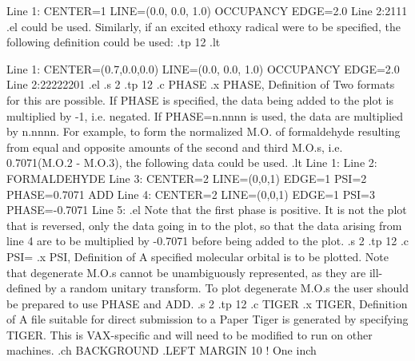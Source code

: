 Line 1:  CENTER=1 LINE=(0.0, 0.0, 1.0) OCCUPANCY EDGE=2.0 
Line 2:2111
.el
could be used. Similarly, if an excited ethoxy radical were to be specified,
the following definition could be used:
.tp 12
.lt

Line 1:  CENTER=(0.7,0.0,0.0) LINE=(0.0, 0.0, 1.0) OCCUPANCY EDGE=2.0 
Line 2:22222201
.el
.s 2
.tp 12
.c
 PHASE
.x PHASE, Definition of
 Two formats for this are possible. If PHASE is specified, the
data being added to the plot is multiplied by -1, i.e. negated. 
If PHASE=n.nnnn is used,
the data are multiplied by n.nnnn. For example, to form the normalized
M.O. of formaldehyde resulting from equal and opposite amounts of the
second and third M.O.s, i.e. 0.7071(M.O.2 - M.O.3), the following 
data could be used.
.lt
Line 1:
Line 2:   FORMALDEHYDE
Line 3: CENTER=2 LINE=(0,0,1) EDGE=1 PSI=2 PHASE=0.7071 ADD
Line 4: CENTER=2 LINE=(0,0,1) EDGE=1 PSI=3 PHASE=-0.7071
Line 5:
.el
 Note that the first phase is positive. It is not the plot that is reversed,
only the data going in to the plot, so that the data arising from line 4
are to be multiplied by -0.7071 before being added to the plot.
.s 2
.tp 12
.c
 PSI=        
.x PSI, Definition of
 A specified molecular orbital is to be plotted. Note that degenerate
M.O.s cannot be unambiguously represented, as they are ill-defined
by a random unitary transform. To plot degenerate M.O.s the user should
be prepared to use PHASE and ADD.
.s 2
.tp 12
.c
TIGER
.x TIGER, Definition of
 A file suitable for direct submission to a Paper Tiger is generated
by specifying TIGER. This is VAX-specific and will need to be
modified to run on other machines.
.ch BACKGROUND
.LEFT MARGIN 10                 ! One inch

